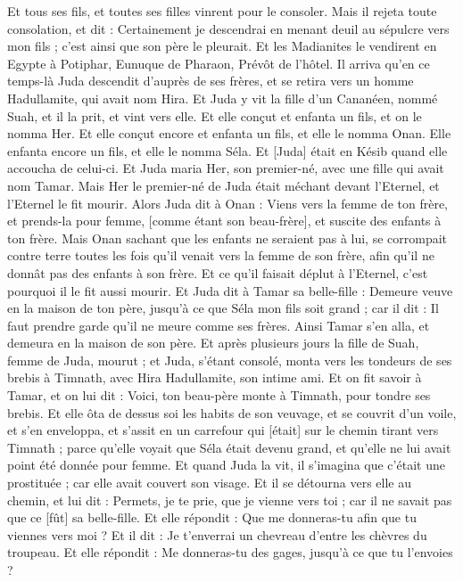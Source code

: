 \begin{multicols}{2}
Et tous ses fils, et toutes ses filles vinrent pour le consoler. Mais il rejeta toute consolation, et dit : Certainement je descendrai en menant deuil au sépulcre vers mon fils ; c'est ainsi que son père le pleurait.
Et les Madianites le vendirent en Egypte à Potiphar, Eunuque de Pharaon, Prévôt de l'hôtel.
\VerseOne{}Il arriva qu'en ce temps-là Juda descendit d'auprès de ses frères, et se retira vers un homme Hadullamite, qui avait nom Hira.
Et Juda y vit la fille d'un Cananéen, nommé Suah, et il la prit, et vint vers elle.
Et elle conçut et enfanta un fils, et on le nomma Her.
Et elle conçut encore et enfanta un fils, et elle le nomma Onan.
Elle enfanta encore un fils, et elle le nomma Séla. Et [Juda] était en Késib quand elle accoucha de celui-ci.
Et Juda maria Her, son premier-né, avec une fille qui avait nom Tamar.
Mais Her le premier-né de Juda était méchant devant l'Eternel, et l'Eternel le fit mourir.
Alors Juda dit à Onan : Viens vers la femme de ton frère, et prends-la pour femme, [comme étant son beau-frère], et suscite des enfants à ton frère.
Mais Onan sachant que les enfants ne seraient pas à lui, se corrompait contre terre toutes les fois qu'il venait vers la femme de son frère, afin qu'il ne donnât pas des enfants à son frère.
Et ce qu'il faisait déplut à l'Eternel, c'est pourquoi il le fit aussi mourir.
Et Juda dit à Tamar sa belle-fille : Demeure veuve en la maison de ton père, jusqu'à ce que Séla mon fils soit grand ; car il dit : Il faut prendre garde qu'il ne meure comme ses frères. Ainsi Tamar s'en alla, et demeura en la maison de son père.
Et après plusieurs jours la fille de Suah, femme de Juda, mourut ; et Juda, s'étant consolé, monta vers les tondeurs de ses brebis à Timnath, avec Hira Hadullamite, son intime ami.
Et on fit savoir à Tamar, et on lui dit : Voici, ton beau-père monte à Timnath, pour tondre ses brebis.
Et elle ôta de dessus soi les habits de son veuvage, et se couvrit d'un voile, et s'en enveloppa, et s'assit en un carrefour qui [était] sur le chemin tirant vers Timnath ; parce qu'elle voyait que Séla était devenu grand, et qu'elle ne lui avait point été donnée pour femme.
Et quand Juda la vit, il s'imagina que c'était une prostituée ; car elle avait couvert son visage.
Et il se détourna vers elle au chemin, et lui dit : Permets, je te prie, que je vienne vers toi ; car il ne savait pas que ce [fût] sa belle-fille. Et elle répondit : Que me donneras-tu afin que tu viennes vers moi ?
Et il dit : Je t'enverrai un chevreau d'entre les chèvres du troupeau. Et elle répondit : Me donneras-tu des gages, jusqu'à ce que tu l'envoies ?

\end{multicols}
